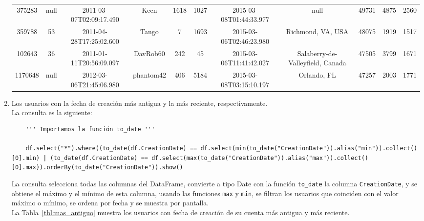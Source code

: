 \documentclass[12pt,a4paper,twoside,openright,titlepage,final]{article}
\begin{document}
\begin{enumerate}
\begin{table}[htbp!]
{\begin{tabular}{@{}ccccccccccc@{}}
			375283             & null         & 2011-03-07T02:09:17.490 & Keen                 & 1618               & 1027        & 2015-03-08T01:44:33.977 & null                             & 49731               & 4875             & 2560           \\
			359788             & 53           & 2011-04-28T17:25:02.600 & Tango                & 7                  & 1693        & 2015-03-06T02:46:23.980 & Richmond, VA, USA                & 48075               & 1919             & 1517           \\
			102643             & 36           & 2011-01-11T20:56:09.097 & DavRob60             & 242                & 45          & 2015-03-06T11:41:42.027 & Salaberry-de-Valleyfield, Canada & 47505               & 3799             & 1671           \\
			1170648            & null         & 2012-03-06T21:45:06.980 & phantom42            & 406                & 5184        & 2015-03-08T03:15:10.197 & Orlando, FL                      & 47257               & 2003             & 1771           \\ \bottomrule
			\end{tabular}%
		}
	\end{table}
		
	\item Los usuarios con la fecha de creación más antigua y la más reciente, respectivamente.\\
	
	La consulta es la siguiente:
	
	\begin{verbatim}
	''' Importamos la función to_date '''
	
	df.select("*").where((to_date(df.CreationDate) == df.select(min(to_date("CreationDate")).alias("min")).collect()[0].min) | (to_date(df.CreationDate) == df.select(max(to_date("CreationDate")).alias("max")).collect()[0].max)).orderBy(to_date("CreationDate")).show()
	\end{verbatim}
	
	La consulta selecciona todas las columnas del DataFrame, convierte a tipo Date con la función \texttt{to\_date} la columna \texttt{CreationDate}, y se obtiene el máximo y el mínimo de esta columna, usando las funciones \texttt{max} y \texttt{min}, se filtran los usuarios que coinciden con el valor máximo o mínimo, se ordena por fecha y se muestra por pantalla.\\
	
	La Tabla~\ref{tbl:mas_antiguo} muestra los usuarios con fecha de creación de su cuenta más antigua y más reciente.\\
	

\end{enumerate}
\end{document}
